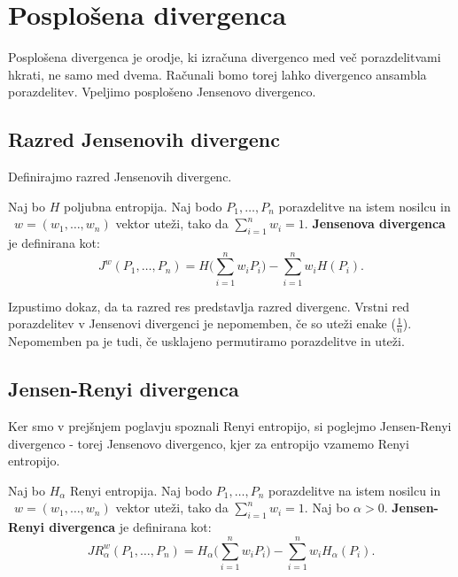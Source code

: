 \section{Posplošena divergenca}

Posplošena divergenca je orodje, ki izračuna divergenco med več porazdelitvami hkrati, ne samo med dvema. Računali bomo torej lahko divergenco ansambla porazdelitev. Vpeljimo posplošeno Jensenovo divergenco.

\subsection{Razred Jensenovih divergenc}

Definirajmo razred Jensenovih divergenc.

\begin{definicija}
    Naj bo $H$ poljubna entropija. Naj bodo $P_1, \ldots, P_n$ porazdelitve na istem nosilcu in \\ $w = (w_1, \ldots, w_n)$ vektor uteži, tako da $\sum_{i=1}^n w_i = 1$. \textbf{Jensenova divergenca} je definirana kot:
    \begin{equation}
        J^w (P_1, \ldots, P_n) = H \Big(\sum_{i=1}^n w_i P_i\Big) - \sum_{i=1}^n w_i H(P_i).
    \end{equation}
\end{definicija}

Izpustimo dokaz, da ta razred res predstavlja razred divergenc. Vrstni red porazdelitev v Jensenovi divergenci je nepomemben, če so uteži enake ($\frac{1}{n}$). Nepomemben pa je tudi, če usklajeno permutiramo porazdelitve in uteži.

\subsection{Jensen-Renyi divergenca}

Ker smo v prejšnjem poglavju spoznali Renyi entropijo, si poglejmo Jensen-Renyi divergenco - torej Jensenovo divergenco, kjer za entropijo vzamemo Renyi entropijo.

\begin{definicija}
    Naj bo $H_\alpha$ Renyi entropija. Naj bodo $P_1, \ldots, P_n$ porazdelitve na istem nosilcu in \\ $w = (w_1, \ldots, w_n)$ vektor uteži, tako da $\sum_{i=1}^n w_i = 1$. Naj bo $\alpha > 0$. \textbf{Jensen-Renyi divergenca} je definirana kot:
    \begin{equation}\label{JRDformula}
        JR_\alpha^w (P_1, \ldots, P_n) = H_\alpha \Big(\sum_{i=1}^n w_i P_i\Big) - \sum_{i=1}^n w_i H_\alpha(P_i).
    \end{equation}
\end{definicija}

